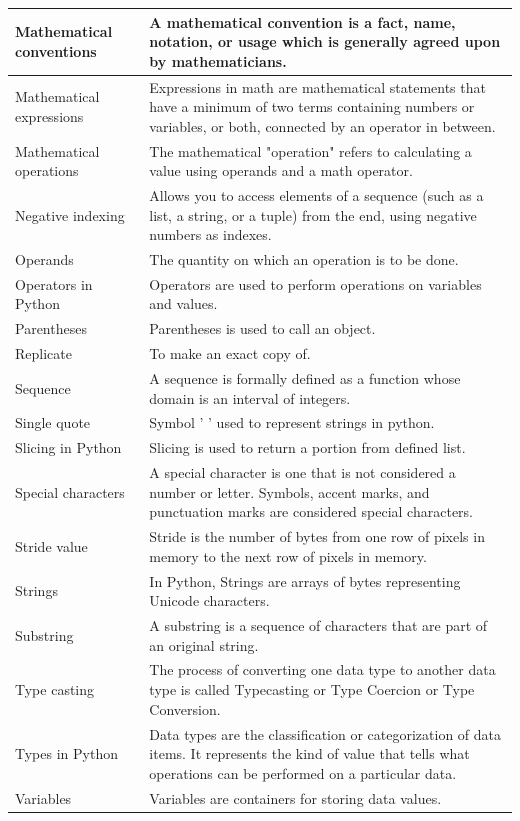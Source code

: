 \documentclass[../../data_analysis_python.tex]{subfiles}
\begin{document}
\begin{longtable}{p{3cm} p{12cm}}
        \hline 
        Mathematical conventions & A mathematical convention is a fact, name, notation, or usage which is generally agreed upon by mathematicians. \\ 
        \hline 
        Mathematical expressions & Expressions in math are mathematical statements that have a minimum of two terms containing numbers or variables, or both, connected by an operator in between. \\ 
        \hline 
        Mathematical operations & The mathematical "operation" refers to calculating a value using operands and a math operator. \\ 
        \hline 
        Negative indexing & Allows you to access elements of a sequence (such as a list, a string, or a tuple) from the end, using negative numbers as indexes. \\ 
        \hline 
        Operands & The quantity on which an operation is to be done. \\ 
        \hline 
        Operators in Python & Operators are used to perform operations on variables and values. \\ 
        \hline 
        Parentheses & Parentheses is used to call an object. \\ 
        \hline 
        Replicate & To make an exact copy of. \\ 
        \hline 
        Sequence & A sequence is formally defined as a function whose domain is an interval of integers. \\ 
        \hline 
        Single quote & Symbol ' ' used to represent strings in python. \\ 
        \hline 
        Slicing in Python & Slicing is used to return a portion from defined list. \\ 
        \hline 
        Special characters & A special character is one that is not considered a number or letter. Symbols, accent marks, and punctuation marks are considered special characters. \\ 
        \hline 
        Stride value & Stride is the number of bytes from one row of pixels in memory to the next row of pixels in memory. \\ 
        \hline 
        Strings & In Python, Strings are arrays of bytes representing Unicode characters. \\ 
        \hline 
        Substring & A substring is a sequence of characters that are part of an original string. \\ 
        \hline 
        Type casting & The process of converting one data type to another data type is called Typecasting or Type Coercion or Type Conversion. \\ 
        \hline 
        Types in Python & Data types are the classification or categorization of data items. It represents the kind of value that tells what operations can be performed on a particular data. \\ 
        \hline 
        Variables & Variables are containers for storing data values. \\ 
    \end{longtable}
\end{document}
